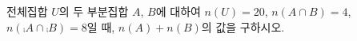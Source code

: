 전체집합 $U$의 두 부분집합 $A$, $B$에 대하여 $n(U)=20$, $n(A\cap B)=4$, $n(\comp{A}\cap\comp{B})=8$일 때, $n(A)+n(B)$의 값을 구하시오.
